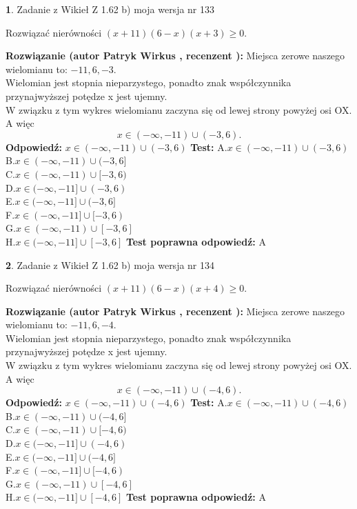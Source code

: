 \documentclass[12pt, a4paper]{article}
\theoremstyle{definition} %
\newtheorem{zad}{}
\newcommand{\zadStart}[1]{\begin{zad}#1\newline}
\newcommand{\zadStop}{\end{zad}}
\newcommand{\rozwStart}[2]{\noindent \textbf{Rozwiązanie (autor #1 , recenzent #2): }\newline}
\newcommand{\rozwStop}{\newline}
\newcommand{\odpStart}{\noindent \textbf{Odpowiedź:}\newline}
\newcommand{\odpStop}{\newline}
\newcommand{\testStart}{\noindent \textbf{Test:}\newline}
\newcommand{\testStop}{\newline}
\newcommand{\kluczStart}{\noindent \textbf{Test poprawna odpowiedź:}\newline}
\newcommand{\kluczStop}{\newline}
\begin{document}
\zadStart{Zadanie z Wikieł Z 1.62 b) moja wersja nr 133}

Rozwiązać nierówności $(x+11)(6-x)(x+3)\ge0$.
\zadStop
\rozwStart{Patryk Wirkus}{}
Miejsca zerowe naszego wielomianu to: $-11, 6, -3$.\\
Wielomian jest stopnia nieparzystego, ponadto znak współczynnika przy\linebreak najwyższej potędze x jest ujemny.\\ W związku z tym wykres wielomianu zaczyna się od lewej strony powyżej osi OX. A więc $$x \in (-\infty,-11) \cup (-3,6).$$
\rozwStop
\odpStart
$x \in (-\infty,-11) \cup (-3,6)$
\odpStop
\testStart
A.$x \in (-\infty,-11) \cup (-3,6)$\\
B.$x \in (-\infty,-11) \cup (-3,6]$\\
C.$x \in (-\infty,-11) \cup [-3,6)$\\
D.$x \in (-\infty,-11] \cup (-3,6)$\\
E.$x \in (-\infty,-11] \cup (-3,6]$\\
F.$x \in (-\infty,-11] \cup [-3,6)$\\
G.$x \in (-\infty,-11) \cup [-3,6]$\\
H.$x \in (-\infty,-11] \cup [-3,6]$
\testStop
\kluczStart
A
\kluczStop



\zadStart{Zadanie z Wikieł Z 1.62 b) moja wersja nr 134}

Rozwiązać nierówności $(x+11)(6-x)(x+4)\ge0$.
\zadStop
\rozwStart{Patryk Wirkus}{}
Miejsca zerowe naszego wielomianu to: $-11, 6, -4$.\\
Wielomian jest stopnia nieparzystego, ponadto znak współczynnika przy\linebreak najwyższej potędze x jest ujemny.\\ W związku z tym wykres wielomianu zaczyna się od lewej strony powyżej osi OX. A więc $$x \in (-\infty,-11) \cup (-4,6).$$
\rozwStop
\odpStart
$x \in (-\infty,-11) \cup (-4,6)$
\odpStop
\testStart
A.$x \in (-\infty,-11) \cup (-4,6)$\\
B.$x \in (-\infty,-11) \cup (-4,6]$\\
C.$x \in (-\infty,-11) \cup [-4,6)$\\
D.$x \in (-\infty,-11] \cup (-4,6)$\\
E.$x \in (-\infty,-11] \cup (-4,6]$\\
F.$x \in (-\infty,-11] \cup [-4,6)$\\
G.$x \in (-\infty,-11) \cup [-4,6]$\\
H.$x \in (-\infty,-11] \cup [-4,6]$
\testStop
\kluczStart
A
\kluczStop
\end{document}
